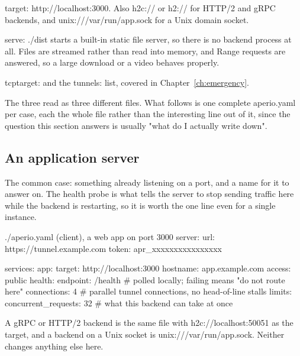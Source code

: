 \documentclass[11pt,a4paper,oneside]{book}
\newcommand{\aperiobreakableunderscore}{\textunderscore\allowbreak}
\newcommand{\aperiocodebreaks}{\XeTeXinterchartokenstate=1 }
\newcommand{\aperiocodebreaks}{}
\DeclareRobustCommand{\code}[1]{{\ttfamily\small\aperiocodebreaks
  \let\_\aperiobreakableunderscore#1}}
\begin{document}
\begin{description}[leftmargin=1.6em,style=nextline]
  \item[A backend URL] \code{target: http://localhost:3000}. Also
        \code{h2c://} or \code{h2://} for HTTP/2 and gRPC backends, and
        \code{unix:///var/run/app.sock} for a Unix domain socket.
  \item[A directory] \code{serve: ./dist} starts a built-in static file
        server, so there is no backend process at all. Files are
        streamed rather than read into memory, and \code{Range} requests
        are answered, so a large download or a video behaves properly.
  \item[A raw TCP port] \code{tcp\_target:} and the \code{tunnels:} list,
        covered in Chapter~\ref{ch:emergency}.
\end{description}

The three read as three different files. What follows is one complete
\code{aperio.yaml} per case, each the whole file rather than the
interesting line out of it, since the question this section answers is
usually "what do I actually write down".

\subsection{An application server}

The common case: something already listening on a port, and a name for it
to answer on. The health probe is what tells the server to stop sending
traffic here while the backend is restarting, so it is worth the one line
even for a single instance.

\begin{codecard}[aperioyaml]{./aperio.yaml (client), a web app on port 3000}
server:
  url: https://tunnel.example.com
  token: apr_xxxxxxxxxxxxxxxx

services:
  app:
    target: http://localhost:3000
    hostname: app.example.com
    access: public
    health:
      endpoint: /health          # polled locally; failing means "do not route here"
    connections: 4               # parallel tunnel connections, no head-of-line stalls
    limits:
      concurrent_requests: 32    # what this backend can take at once
\end{codecard}

A gRPC or HTTP/2 backend is the same file with \code{h2c://localhost:50051}
as the target, and a backend on a Unix socket is
\code{unix:///var/run/app.sock}. Neither changes anything else here.
\end{document}
